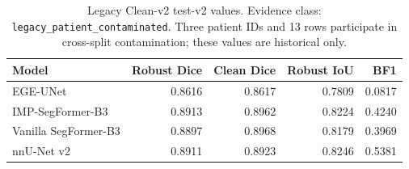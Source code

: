 
\begin{table}[t]
\centering
\caption{Legacy Clean-v2 test-v2 values. Evidence class: \texttt{legacy\_patient\_contaminated}. Three patient IDs and 13 rows participate in cross-split contamination; these values are historical only.}
\label{tab:legacy-loop170}
\begin{tabular}{lrrrr}
\toprule
Model & Robust Dice & Clean Dice & Robust IoU & BF1 \\
\midrule
EGE-UNet & 0.8616 & 0.8617 & 0.7809 & 0.0817 \\
IMP-SegFormer-B3 & 0.8913 & 0.8962 & 0.8224 & 0.4240 \\
Vanilla SegFormer-B3 & 0.8897 & 0.8968 & 0.8179 & 0.3969 \\
nnU-Net v2 & 0.8911 & 0.8923 & 0.8246 & 0.5381 \\
\bottomrule
\end{tabular}
\end{table}
